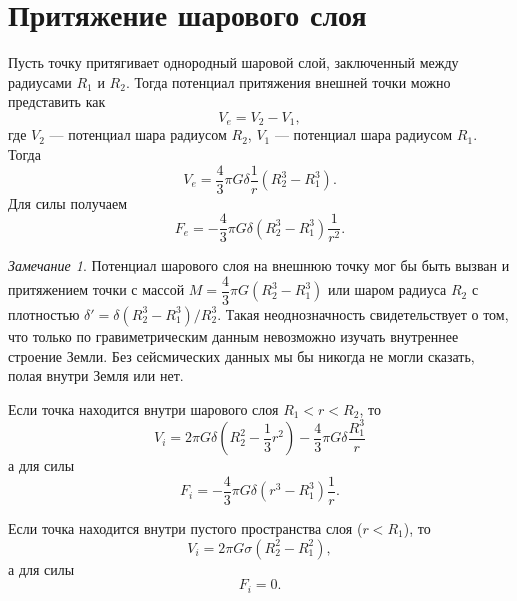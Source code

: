 \documentclass[11pt, a4paper]{article}
\theoremstyle{plain}
\theoremstyle{definition}
\theoremstyle{remark}
\newtheorem{remark}{Замечание}
\begin{document}
\section{Притяжение шарового слоя}
Пусть точку притягивает однородный шаровой слой, заключенный между радиусами $R_1$ и $R_2$. Тогда
потенциал притяжения внешней точки можно представить как
\begin{equation*}
    V_e = V_{2} - V_{1},
\end{equation*}
где $V_2$ --- потенциал шара радиусом $R_2$, $V_1$ --- потенциал шара радиусом $R_1$. Тогда
\begin{equation*}
    V_e = \dfrac{4}{3}\pi G\delta \dfrac{1}{r} \left( R_2^3 - R_1^3 \right).
\end{equation*}
Для силы получаем
\begin{equation*}
    F_e = -\dfrac{4}{3} \pi G\delta\left( R_2^3 - R_1^3 \right)\dfrac{1}{r^2}.
\end{equation*}
\begin{remark}
    Потенциал шарового слоя на внешнюю точку мог бы быть вызван и притяжением точки с массой
    $M = \dfrac{4}{3}\pi G\left( R_2^3 - R_1^3 \right)$ или шаром радиуса $R_2$ с плотностью 
    $\delta' = \delta\left( R_2^3 - R_1^3 \right) / R_2^3$. Такая неоднозначность свидетельствует о
    том, что только по гравиметрическим данным невозможно изучать внутреннее строение Земли.
    Без сейсмических данных мы бы никогда не могли сказать, полая внутри Земля или нет.
\end{remark}
Если точка находится внутри шарового слоя $R_1 < r < R_2$, то
\begin{equation*}
    V_i = 2\pi G\delta \left( R_2^2 - \dfrac{1}{3}r^2 \right) - \dfrac{4}{3}\pi G\delta\dfrac{R_1^3}{r}
\end{equation*}
а для силы
\begin{equation*}
    F_i = -\dfrac{4}{3}\pi G\delta \left( r^3 - R_1^3 \right) \dfrac{1}{r}.
\end{equation*}

Если точка находится внутри пустого пространства слоя ($r < R_1$), то
\begin{equation*}
    V_i = 2\pi G\sigma \left( R_2^2 - R_1^2 \right),
\end{equation*}
а для силы
\begin{equation*}
    F_i = 0.
\end{equation*}

\end{document}
